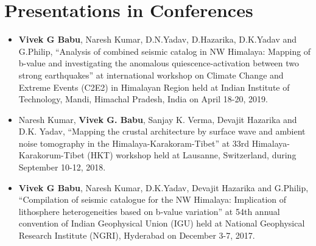 \section*{Presentations in Conferences}
\vspace{-0.5cm}
\begin{itemize}
    \item \textbf{Vivek G Babu}, Naresh Kumar, D.N.Yadav, D.Hazarika, D.K.Yadav and G.Philip, “Analysis of combined seismic catalog in NW Himalaya: Mapping of b-value and investigating the anomalous quiescence-activation between two strong earthquakes” at international workshop on Climate Change and Extreme Events (C2E2) in Himalayan Region held at Indian Institute of Technology, Mandi, Himachal Pradesh, India on April 18-20, 2019.
    
    \item Naresh Kumar, \textbf{Vivek G. Babu}, Sanjay K. Verma, Devajit Hazarika and D.K. Yadav, “Mapping the crustal architecture by surface wave and ambient noise tomography in the Himalaya-Karakoram-Tibet” at 33rd Himalaya-Karakorum-Tibet (HKT) workshop held at Lausanne, Switzerland, during September 10-12, 2018.
    
    \item \textbf{Vivek G Babu}, Naresh Kumar, D.K.Yadav, Devajit Hazarika and G.Philip, “Compilation of seismic catalogue for the NW Himalaya: Implication of lithosphere heterogeneities based on b-value variation” at 54th annual convention of Indian Geophysical Union (IGU) held at National Geophysical Research Institute (NGRI), Hyderabad on December 3-7, 2017.
\end{itemize}

